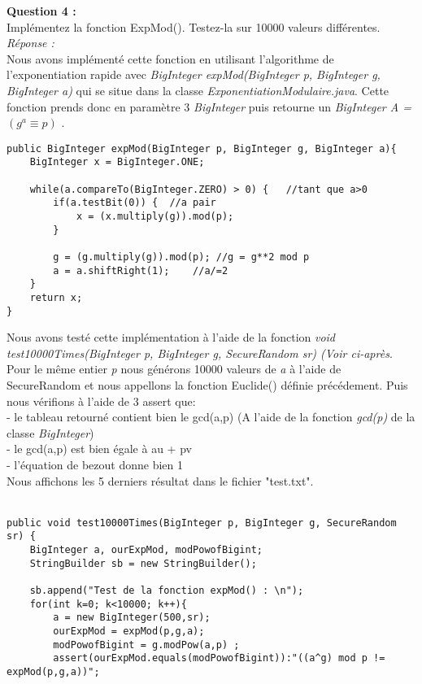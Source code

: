 \documentclass[a4paper,11pt]{article}
\begin{document}
    \textbf{Question 4 : \\}Implémentez la fonction ExpMod(). Testez-la sur 10000 valeurs différentes.
    \textit{\\Réponse :} \\Nous avons implémenté cette fonction en utilisant l'algorithme de l'exponentiation rapide avec \textit{ BigInteger expMod(BigInteger p, BigInteger g, BigInteger a) } qui se situe dans la classe \textit{ExponentiationModulaire.java}. Cette fonction prends donc en paramètre 3 \textit{BigInteger} puis retourne un  \textit{ BigInteger A = $(g^a \equiv p)$} . \\\begin{lstlisting}[caption={Exponentiation rapide}, captionpos=b,breaklines = true]
public BigInteger expMod(BigInteger p, BigInteger g, BigInteger a){
    BigInteger x = BigInteger.ONE;

    while(a.compareTo(BigInteger.ZERO) > 0) {   //tant que a>0
        if(a.testBit(0)) {  //a pair
            x = (x.multiply(g)).mod(p);
        }

        g = (g.multiply(g)).mod(p); //g = g**2 mod p
        a = a.shiftRight(1);    //a/=2
    }
    return x;
}\end{lstlisting}Nous avons testé cette implémentation à l'aide de la fonction \textit{ void test10000Times(BigInteger p, BigInteger g, SecureRandom sr) (Voir ci-après}.\\Pour le même entier \textit{p} nous générons 10000 valeurs de \textit{a} à l'aide de SecureRandom et nous appellons la fonction Euclide() définie précédement. Puis nous vérifions à l'aide de 3 assert que:\\ - le tableau retourné contient bien le gcd(a,p) (A l'aide de la fonction \textit{gcd(p)} de la classe \textit{BigInteger})\\ - le gcd(a,p) est bien égale à au + pv\\ - l'équation de bezout donne bien 1\\ Nous affichons les 5 derniers résultat dans le fichier "test.txt". \\\\\begin{lstlisting}[caption={testExpMod}, captionpos=b,breaklines = true]
public void test10000Times(BigInteger p, BigInteger g, SecureRandom sr) {
    BigInteger a, ourExpMod, modPowofBigint;
    StringBuilder sb = new StringBuilder();

    sb.append("Test de la fonction expMod() : \n");
    for(int k=0; k<10000; k++){
        a = new BigInteger(500,sr);
        ourExpMod = expMod(p,g,a);
        modPowofBigint = g.modPow(a,p) ;
        assert(ourExpMod.equals(modPowofBigint)):"((a^g) mod p != expMod(p,g,a))";


\end{lstlisting}
\end{document}
